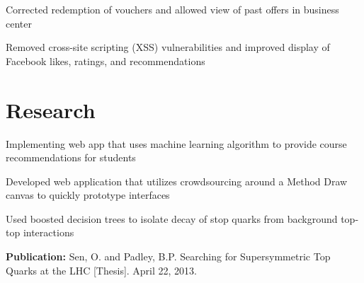 \documentclass{onkursen-resume}
\begin{document}
\begin{itemize*}
\item Corrected redemption of vouchers and allowed view of past offers in business center
\end{itemize*}
\vspace{-1mm}

\begin{itemize*}
\item Removed cross-site scripting (XSS) vulnerabilities and improved display of Facebook likes, ratings, and recommendations
\end{itemize*}
\vspace{-1mm}

\hr

\section*{Research}

\begin{itemize*}
\item Implementing web app that uses machine learning algorithm to provide course recommendations for students
\end{itemize*}
\vspace{-1mm}

\begin{itemize*}
\item Developed web application that utilizes crowdsourcing around a Method Draw canvas to quickly prototype interfaces
\end{itemize*}
\vspace{-1mm}

\begin{itemize*}
\item Used boosted decision trees to isolate decay of stop quarks from background top-top interactions
\item {\bf Publication:} Sen, O. and Padley, B.P. Searching for Supersymmetric Top Quarks at the LHC [Thesis]. April 22, 2013.
\end{itemize*}
\vspace{-1mm}
\end{document}
